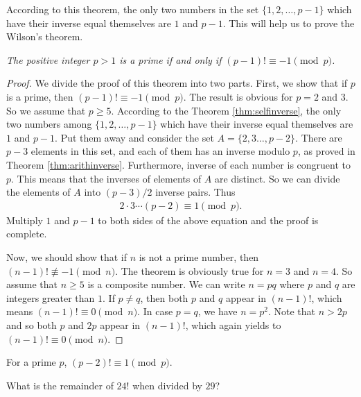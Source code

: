 \documentclass{subfile}
\begin{document}
	According to this theorem, the only two numbers in the set $\{1, 2, \ldots, p-1\}$ which have their inverse equal themselves are $1$ and $p-1$. This will help us to prove the Wilson's theorem.
		\begin{theorem}  \slshape
			The positive integer $p>1$ is a prime if and only if $(p-1)! \equiv -1 \pmod p$.
		\end{theorem}
		
		\begin{proof}
			We divide the proof of this theorem into two parts. First, we show that if $p$ is a prime, then $(p-1)! \equiv -1 \pmod p$.
			The result is obvious for $p=2$ and $3$. So we assume that $p \geq 5$. According to the Theorem \ref{thm:selfinverse}, the only two numbers among  $\{1, 2, \ldots, p-1\}$ which have their inverse equal themselves are $1$ and $p-1$. Put them away and consider the set  $A=\{2, 3 \ldots, p-2\}$. There are $p-3$ elements in this set, and each of them has an inverse modulo $p$, as proved in Theorem \ref{thm:arithinverse}. Furthermore, inverse of each number is congruent to $p$. This means that the inverses of elements of $A$ are distinct. So we can divide the elements of $A$ into $(p-3)/2$ inverse pairs. Thus
			\begin{align*}
			2 \cdot 3  \cdots  (p-2) \equiv 1 \pmod p.
			\end{align*}
			Multiply $1$ and $p-1$ to both sides of the above equation and the proof is complete.
			
			Now, we should show that if $n$ is not a prime number, then $(n-1)! \not \equiv -1 \pmod n$.
			The theorem is obviously true for $n=3$ and $n=4$. So assume that $n \geq 5$ is a composite number. We can write $n=pq$ where $p$ and $q$ are integers greater than $1$. If $p \neq q$, then both $p$ and $q$ appear in $(n-1)!$, which means $(n-1)! \equiv 0 \pmod n$. In case $p=q$, we have $n=p^2$. Note that $n>2p$ and so both $p$ and $2p$ appear in $(n-1)!$, which again yields to $(n-1)! \equiv 0 \pmod n$.
		\end{proof}
	
		\begin{corollary}
			For a prime $p$, $(p-2)! \equiv 1 \pmod p$.
		\end{corollary}
		
		\begin{problem}
			What is the remainder of $24!$ when divided by $29$?
		\end{problem}
		
\end{document}
